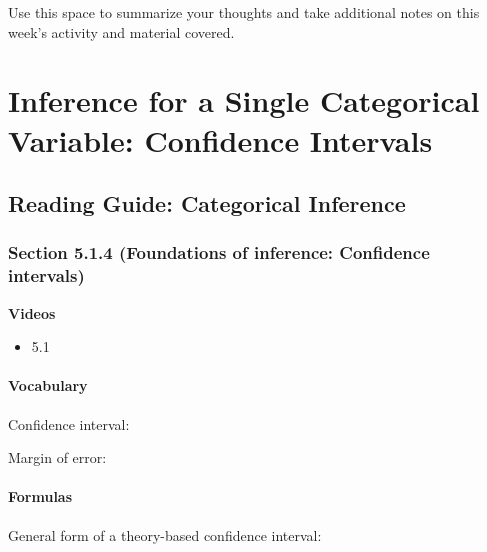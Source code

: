 \documentclass[
]{report}
\providecommand{\tightlist}{%
  \setlength{\itemsep}{0pt}\setlength{\parskip}{0pt}}
\newcommand{\rgs}{\vspace{12pt}} %
\begin{document}
Use this space to summarize your thoughts and take additional notes on this week's activity and material covered.

\hypertarget{inference-for-a-single-categorical-variable-confidence-intervals}{%
\chapter{Inference for a Single Categorical Variable: Confidence Intervals}\label{inference-for-a-single-categorical-variable-confidence-intervals}}

\hypertarget{reading-guide-categorical-inference-1}{%
\section{Reading Guide: Categorical Inference}\label{reading-guide-categorical-inference-1}}

\hypertarget{section-5.1.4-foundations-of-inference-confidence-intervals}{%
\subsection*{Section 5.1.4 (Foundations of inference: Confidence intervals)}\label{section-5.1.4-foundations-of-inference-confidence-intervals}}

\textbf{Videos}

\begin{itemize}
\tightlist
\item
  5.1
\end{itemize}


\hypertarget{vocabulary-13}{%
\subsubsection*{Vocabulary}\label{vocabulary-13}}

Confidence interval:
\rgs

Margin of error:
\rgs

\hypertarget{formulas-3}{%
\subsubsection*{Formulas}\label{formulas-3}}

General form of a theory-based confidence interval:
\rgs
\end{document}
